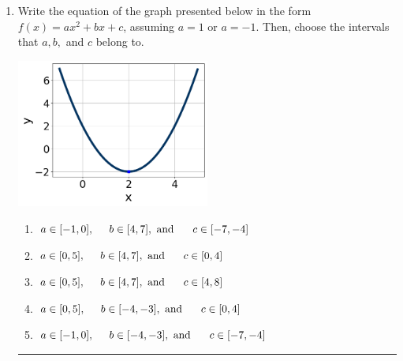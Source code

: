 \documentclass[14pt]{extbook}
\newcommand{\litem}[1]{\item#1\hspace*{-1cm}\rule{\textwidth}{0.4pt}}
\begin{document}
\begin{enumerate}
{\begin{enumerate}[label=\Alph*.]
\end{enumerate} }
\litem{
Write the equation of the graph presented below in the form $f(x)=ax^2+bx+c$, assuming  $a=1$ or $a=-1$. Then, choose the intervals that $a, b,$ and $c$ belong to.
\begin{center}
    \includegraphics[width=0.5\textwidth]{../Figures/quadraticGraphToEquationC.png}
\end{center}
\begin{enumerate}[label=\Alph*.]
\item \( a \in [-1, 0], \hspace*{5mm} b \in [4, 7], \text{ and } \hspace*{5mm} c \in [-7, -4] \)
\item \( a \in [0, 5], \hspace*{5mm} b \in [4, 7], \text{ and } \hspace*{5mm} c \in [0, 4] \)
\item \( a \in [0, 5], \hspace*{5mm} b \in [4, 7], \text{ and } \hspace*{5mm} c \in [4, 8] \)
\item \( a \in [0, 5], \hspace*{5mm} b \in [-4, -3], \text{ and } \hspace*{5mm} c \in [0, 4] \)
\item \( a \in [-1, 0], \hspace*{5mm} b \in [-4, -3], \text{ and } \hspace*{5mm} c \in [-7, -4] \)


\end{enumerate}}
\end{enumerate}
\end{document}
